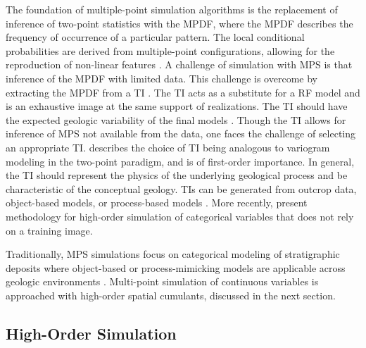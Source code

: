 The foundation of multiple-point simulation algorithms \citep{guardiano1993multivariate,strebelle2002conditional} is the replacement of inference of two-point statistics with the \gls{MPDF}, where the \gls{MPDF} describes the frequency of occurrence of a particular pattern. The local conditional probabilities are derived from multiple-point configurations, allowing for the reproduction of non-linear features \citep{silva2014guide}. A challenge of simulation with \gls{MPS} is that inference of the \gls{MPDF} with limited data. This challenge is overcome by extracting the \gls{MPDF} from a \gls{TI} \citep{journel2005covariance}. The \gls{TI} acts as a substitute for a \gls{RF} model and is an exhaustive image at the same support of realizations. The \gls{TI} should have the expected geologic variability of the final models \citep{gomez-hernandez2021one}. Though the \gls{TI} allows for inference of \gls{MPS} not available from the data, one faces the challenge of selecting an appropriate \gls{TI}. \cite{boisvert2007multiplepoint} describes the choice of \gls{TI} being analogous to variogram modeling in the two-point paradigm, and is of first-order importance. In general, the TI should represent the physics of the underlying geological process and be characteristic of the conceptual geology. \Glspl{TI} can be generated from outcrop data, object-based models, or process-based models \citep{tahmasebi2018multiple}. More recently, \cite{minniakhmetov2022highorder} present methodology for high-order simulation of categorical variables that does not rely on a training image.

Traditionally, \gls{MPS} simulations focus on categorical modeling of stratigraphic deposits where object-based or process-mimicking models are applicable across geologic environments \citep{mariethoz2014multiplepoint}. Multi-point simulation of continuous variables is approached with high-order spatial cumulants, discussed in the next section.

\subsection{High-Order Simulation}
\label{subsec:03hosim}

